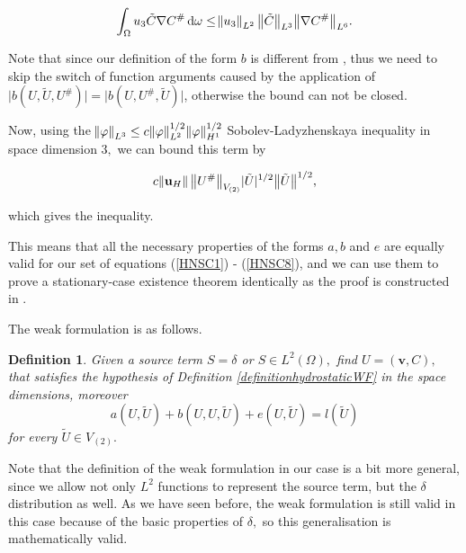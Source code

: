 \documentclass[11pt]{article}
\newtheorem{definition}{Definition}
\newcommand*\diff{\mathop{}\!\mathrm{d}}
\begin{document}
\begin{itemize}
  \[  \int_\Omega u_3 \tilde{C} \nabla C^\# \diff \omega  \leq  \norm{u_3}_{L^2} \big \| \tilde{C} \big \| _{L^3} \big \| \nabla C^\# \big \| _{L^6}.\]
  
  Note that since our definition of the form $b$ is different from \cite{temam2005some}, thus we need to skip the switch of function arguments caused by the application of $ \lvert b(U, \tilde{U}, U^\#) \rvert = \lvert b(U, U^\#, \tilde{U}) \rvert$, otherwise the bound can not be closed.
  
  Now, using the $\norm{\varphi}_{L^3} \leq c \norm{\varphi}_{L^2}^{1/2} \norm{\varphi}_{H^1}^{1/2}$ Sobolev-Ladyzhenskaya inequality in space dimension $3,$ we can bound this term by
  
  \[ c \norm{\mathbf{u}_H} \big \| U^\# \big \| _{V_{(2)}} \lvert \tilde{U} \rvert ^ {1/2} \big \| \tilde{U} \big \| ^{1/2} ,\]
  
  which gives the inequality.

\end{itemize}

This means that all the necessary properties of the forms $a, b$ and $e$ are equally valid for our set of equations (\ref{HNSC1}) - (\ref{HNSC8}), and we can use them to prove a stationary-case existence theorem identically as the proof is constructed in \cite{temam2005some}. 

The weak formulation is as follows.



\begin{definition}
Given a source term $S = \delta$ or $S \in L^2(\Omega),$ find $U = (\mathbf{v}, C),$ that satisfies the hypothesis of Definition \ref{definitionhydrostaticWF} in the space dimensions, moreover
\begin{equation} \label{FWSTAT} a(U, \tilde{U}) + b(U,U, \tilde{U}) + e(U, \tilde{U}) = l(\tilde{U}) \end{equation}
for every $\tilde{U} \in V_{(2)}.$
\end{definition}

Note that the definition of the weak formulation in our case is a bit more general, since we allow not only $L^2$ functions to represent the source term, but the $\delta$ distribution as well. As we have seen before, the weak formulation is still valid in this case because of the basic properties of $\delta,$ so this generalisation is mathematically valid. 
\end{document}
